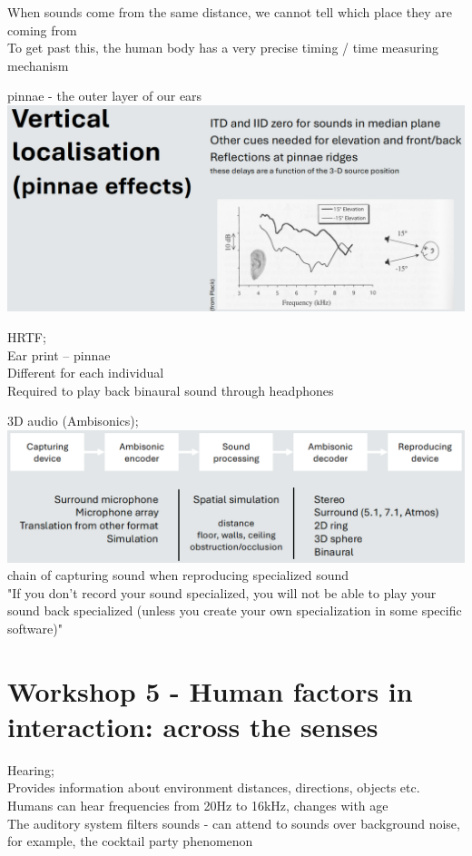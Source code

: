 \documentclass[]{project_plan}
\begin{document}
When sounds come from the same distance, we cannot tell which place they are coming from\\
To get past this, the human body has a very precise timing / time measuring mechanism

pinnae - the outer layer of our ears\\
\includegraphics[width=\linewidth]{vertical_localisation_sound.png}

HRTF;\\
Ear print – pinnae\\
Different for each individual\\
Required to play back binaural sound through headphones

3D audio (Ambisonics);\\
\includegraphics[width=\linewidth]{Ambisonics.png}
chain of capturing sound when reproducing specialized sound\\
"If you don't record your sound specialized, you will not be able to play your sound back specialized (unless you create your own specialization in some specific software)"

\chapter{Workshop 5 - Human factors in interaction: across the senses}
Hearing;\\
Provides information about environment distances, directions, objects etc.\\
Humans can hear frequencies from 20Hz to 16kHz, changes with age\\
The auditory system filters sounds - can attend to sounds
over background noise, for example, the cocktail party phenomenon
\end{document}
